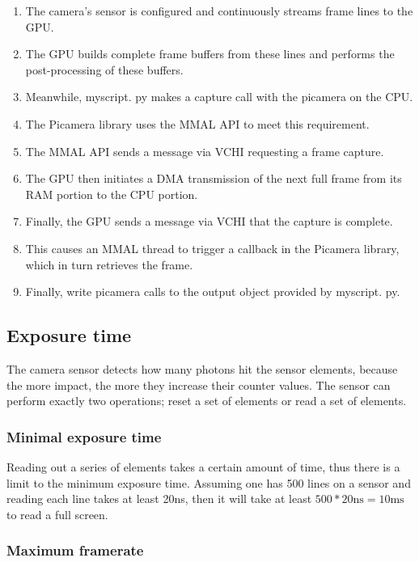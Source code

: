 \documentclass[12pt, a4paper]{report}
\begin{document}
    \begin{enumerate}
    \item The camera's sensor is configured and continuously streams frame lines to the GPU.
    \item The GPU builds complete frame buffers from these lines and performs the post-processing of these buffers.
    \item Meanwhile, myscript. py makes a capture call with the picamera on the CPU.
    \item The Picamera library uses the MMAL API to meet this requirement.
    \item The MMAL API sends a message via VCHI requesting a frame capture.
    \item The GPU then initiates a DMA transmission of the next full frame from its RAM portion to the CPU portion.
    \item Finally, the GPU sends a message via VCHI that the capture is complete.
    \item This causes an MMAL thread to trigger a callback in the Picamera library, which in turn retrieves the frame.
    \item Finally, write picamera calls to the output object provided by myscript. py.
    \end{enumerate}
    
    \subsection{Exposure time}
    
    The camera sensor detects how many photons hit the sensor elements, because the more impact, the more they increase their counter values. The sensor can perform exactly two operations; reset a set of elements or read a set of elements.
    
    \subsubsection{Minimal exposure time}
    
    Reading out a series of elements takes a certain amount of time, thus there is a limit to the minimum exposure time. Assuming one has 500 lines on a sensor and reading each line takes at least 20ns, then it will take at least $500*20 \text{ns} = 10 \text{ms}$ to read a full screen. 
    
    \subsubsection{Maximum framerate}
    
\end{document}
